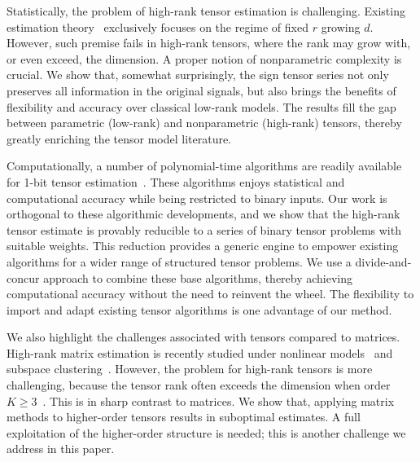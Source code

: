 \documentclass{article}
\theoremstyle{plain}
\theoremstyle{definition}
\begin{document}
Statistically, the problem of high-rank tensor estimation is challenging. Existing estimation theory~\citep{anandkumar2014tensor,montanari2018spectral,cai2019nonconvex} exclusively focuses on the regime of fixed $r$ growing $d$. However, such premise fails in high-rank tensors, where the rank may grow with, or even exceed, the dimension. A proper notion of nonparametric complexity is crucial. We show that, somewhat surprisingly, the sign tensor series not only preserves all information in the original signals, but also brings the benefits of flexibility and accuracy over classical low-rank models. The results fill the gap between parametric (low-rank) and nonparametric (high-rank) tensors, thereby greatly enriching the tensor model literature. 

Computationally, a number of polynomial-time algorithms are readily available for 1-bit tensor estimation~\cite{wang2018learning, han2020optimal, ghadermarzy2018learning}. These algorithms enjoys statistical and computational accuracy while being restricted to binary inputs. Our work is orthogonal to these algorithmic developments, and we show that the high-rank tensor estimate is provably reducible to a series of binary tensor problems with suitable weights. This reduction provides a generic engine to empower existing algorithms for a wider range of structured tensor problems. We use a divide-and-concur approach to combine these base algorithms, thereby achieving computational accuracy without the need to reinvent the wheel. The flexibility to import and adapt existing tensor algorithms is one advantage of our method. 

We also highlight the challenges associated with tensors compared to matrices. High-rank matrix estimation is recently studied under nonlinear models~\citep{ganti2015matrix} and subspace clustering~\citep{pmlr-v70-ongie17a,fan2019online}. However, the problem for high-rank tensors is more challenging, because the tensor rank often exceeds the dimension when order $K\geq 3$~\citep{anandkumar2017analyzing}. This is in sharp contrast to matrices. We show that, applying matrix methods to higher-order tensors results in suboptimal estimates. A full exploitation of the higher-order structure is needed; this is another challenge we address in this paper.
\end{document}
